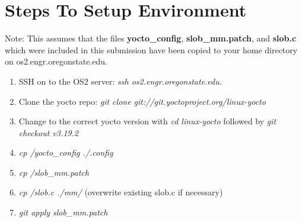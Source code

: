 \documentclass[onecolumn,draftclsnofoot, 10pt, compsoc]{IEEEtran}
\def \patchfile{slob\_mm.patch\xspace}
\begin{document}
\section{Steps To Setup Environment}
	Note: This assumes that the files \textbf{yocto\_config}, \textbf{\patchfile}, and \textbf{slob.c} which were included in this submission have been copied to your home directory on os2.engr.oregonstate.edu.
	\begin{enumerate}
		\item
			SSH on to the OS2 server: \textit{ ssh os2.engr.oregonstate.edu. }
		\item
			Clone the yocto repo: \textit{git clone git://git.yoctoproject.org/linux-yocto}
		\item 
			Change to the correct yocto version with \textit{cd linux-yocto} followed by \textit{git checkout v3.19.2}
		\item 
			\textit{cp \texttildelow/yocto\_config ./.config}
		\item 
			\textit{cp \texttildelow/\patchfile}
		\item 
			\textit{cp \texttildelow/slob.c ./mm/} (overwrite existing slob.c if necessary)
		\item 
			\textit{git apply \patchfile}
	\end{enumerate}
\end{document}
